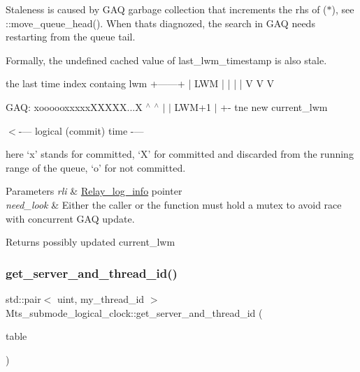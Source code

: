 Staleness is caused by G\+AQ garbage collection that increments the rhs of ($\ast$), see \+::move\+\_\+queue\+\_\+head(). When that\textquotesingle{}s diagnozed, the search in G\+AQ needs restarting from the queue tail.

Formally, the undefined cached value of last\+\_\+lwm\+\_\+timestamp is also stale. \begin{DoxyVerb}       the last time index containg lwm
           +------+
           | LWM  |
           |  |   |
           V  V   V
\end{DoxyVerb}
 G\+AQ\+: xoooooxxxxx\+X\+X\+X\+XX...X $^\wedge$ $^\wedge$ $\vert$ $\vert$ L\+WM+1 $\vert$ +-\/ tne new current\+\_\+lwm

$<$-\/--- logical (commit) time -\/---

here `x' stands for committed, `X' for committed and discarded from the running range of the queue, `o' for not committed.


\begin{DoxyParams}{Parameters}
{\em rli} & \mbox{\hyperlink{classRelay__log__info}{Relay\+\_\+log\+\_\+info}} pointer \\
\hline
{\em need\+\_\+look} & Either the caller or the function must hold a mutex to avoid race with concurrent G\+AQ update.\\
\hline
\end{DoxyParams}
\begin{DoxyReturn}{Returns}
possibly updated current\+\_\+lwm 
\end{DoxyReturn}
\mbox{\label{classMts__submode__logical__clock_ac75e4dcd258a79d3c4eb03ab0bf0ad02}} 
\subsubsection{\texorpdfstring{get\+\_\+server\+\_\+and\+\_\+thread\+\_\+id()}{get\_server\_and\_thread\_id()}}
{\footnotesize\ttfamily std\+::pair$<$ uint, my\+\_\+thread\+\_\+id $>$ Mts\+\_\+submode\+\_\+logical\+\_\+clock\+::get\+\_\+server\+\_\+and\+\_\+thread\+\_\+id (\begin{DoxyParamCaption}\item[{\mbox{\hyperlink{structTABLE}{T\+A\+B\+LE}} $\ast$}]{table }\end{DoxyParamCaption})\hspace{0.3cm}{\ttfamily [protected]}}

